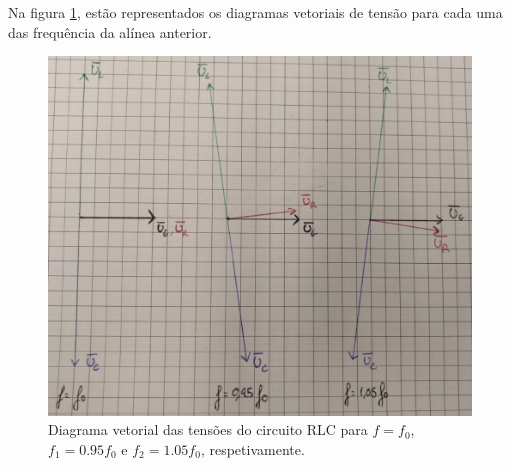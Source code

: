 \documentclass[a4paper, titlepage, portuguese]{article}
\begin{document}
	\newpage
	\subsubsection{}
	
		Na figura \ref{fig:diag_vect}, estão representados os diagramas vetoriais de tensão para cada uma das frequência da alínea anterior.
	
		\begin{figure}[h]
			\centering
			\includegraphics[width=0.6\linewidth]{diag_vect.jpeg}
			\caption{Diagrama vetorial das tensões do circuito RLC para $f=f_0$, $f_1=0.95f_0$ e $f_2=1.05f_0$, respetivamente.}
			\label{fig:diag_vect}
		\end{figure}


\end{document}

